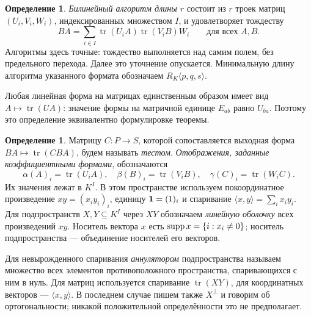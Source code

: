 \documentclass[11pt,a4paper]{article}
\numberwithin{equation}{section}
\theoremstyle{plain}
\theoremstyle{definition}
\newtheorem{definition}[theorem]{Определение}
\DeclareMathOperator{\tr}{tr}\DeclareMathOperator{\rk}{rk}
\newcommand{\pair}[2]{\langle #1,#2\rangle}
\begin{document}
\begin{definition}
\emph{Билинейный алгоритм длины $r$} состоит из $r$ троек матриц
$(U_i,V_i,W_i)$, индексированных множеством $I$, и удовлетворяет тождеству
\begin{equation}\label{eq:algorithm}
 BA=\sum_{i\in I}\tr(U_iA)\tr(V_iB)W_i\qquad\text{для всех }A,B.
\end{equation}
Алгоритмы здесь точные: тождество выполняется над самим полем,
без предельного перехода. Далее это уточнение опускается.
Минимальную длину алгоритма указанного формата обозначаем
$R_K\langle p,q,s\rangle$.
\end{definition}
Любая линейная форма на матрицах единственным образом имеет вид
$A\mapsto\tr(UA)$: значение формы на матричной единице $E_{ab}$ равно
$U_{ba}$. Поэтому это определение эквивалентно формулировке теоремы.

\begin{definition}
Матрицу $C:P\to S$, которой сопоставляется выходная форма
$BA\mapsto\tr(CBA)$, будем называть \emph{тестом}.
\emph{Отображения, заданные коэффициентными формами}, обозначаются
\[
 \alpha(A)_i=\tr(U_iA),\quad
 \beta(B)_i=\tr(V_iB),\quad
 \gamma(C)_i=\tr(W_iC).
\]
Их значения лежат в $K^I$. В этом пространстве используем покоординатное
произведение $xy=(x_i y_i)_i$, единицу $\mathbf1=(1)_i$ и спаривание
$\pair{x}{y}=\sum_i x_i y_i$. Для подпространств $X,Y\subseteq K^I$
через $XY$ обозначаем \emph{линейную оболочку} всех произведений $xy$.
Носитель вектора $x$ есть $\operatorname{supp} x=\{i:x_i\ne0\}$; носитель
подпространства --- объединение носителей его векторов.
\end{definition}
Для невырожденного спаривания \emph{аннулятором} подпространства
называем множество всех элементов противоположного пространства,
спаривающихся с ним в нуль. Для матриц используется спаривание
$\tr(XY)$, для координатных векторов --- $\pair{x}{y}$.
В последнем случае пишем также $X^\perp$ и говорим об ортогональности;
никакой положительной определённости это не предполагает.
\end{document}
